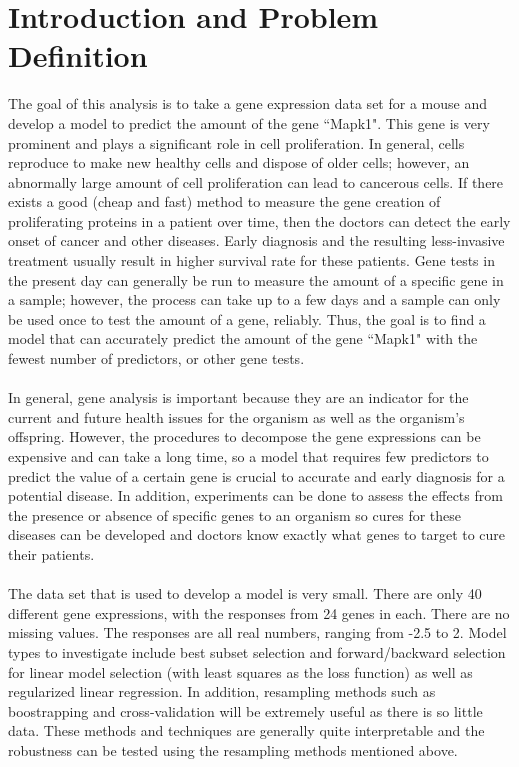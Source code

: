 \documentclass{article}
\begin{document}
\section{Introduction and Problem Definition}
The goal of this analysis is to take a gene expression data set for a mouse and develop a model to predict the amount of the gene ``Mapk1".  This gene is very prominent and plays a significant role in cell proliferation.  In general, cells reproduce to make new healthy cells and dispose of older cells; however, an abnormally large amount of cell proliferation can lead to cancerous cells.  If there exists a good (cheap and fast) method to measure the gene creation of proliferating proteins in a patient over time, then the doctors can detect the early onset of cancer and other diseases.  Early diagnosis and the resulting less-invasive treatment usually result in higher survival rate for these patients.  Gene tests in the present day can generally be run to measure the amount of a specific gene in a sample; however, the process can take up to a few days and a sample can only be used once to test the amount of a gene, reliably.  Thus, the goal is to find a model that can accurately predict the amount of the gene  ``Mapk1" with the fewest number of predictors, or other gene tests.\\
\null\\
%
In general, gene analysis is important because they are an indicator for the current and future health issues for the organism as well as the organism's offspring.  However, the procedures to decompose the gene expressions can be expensive and can take a long time, so a model that requires few predictors to predict the value of a certain gene is crucial to accurate and early diagnosis for a potential disease.  In addition, experiments can be done to assess the effects from the presence or absence of specific genes to an organism so cures for these diseases can be developed and doctors know exactly what genes to target to cure their patients.\\
\null\\
%
The data set that is used to develop a model is very small.  There are only 40 different gene expressions, with the responses from 24 genes
in each.  There are no missing values.  The responses are all real numbers, ranging from -2.5 to 2.  Model types to investigate include best subset selection and forward/backward selection for linear model selection (with least squares as the loss function) as well as regularized linear regression.  In addition, resampling methods such as boostrapping and cross-validation will be extremely useful as there is so little data.  These methods and techniques are generally quite interpretable and the robustness can be tested using the resampling methods mentioned above.\\
\end{document}
